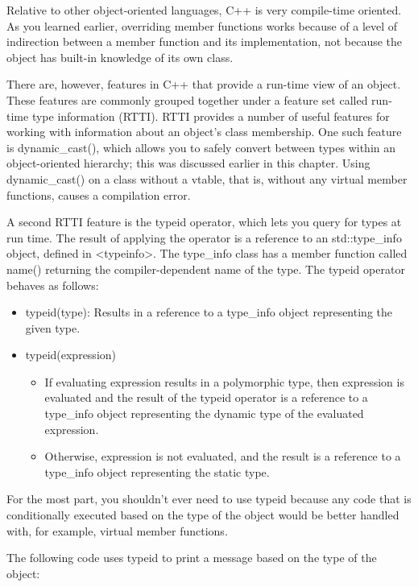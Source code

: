 Relative to other object-oriented languages, C++ is very compile-time oriented. As you learned earlier, overriding member functions works because of a level of indirection between a member function and its implementation, not because the object has built-in knowledge of its own class.

There are, however, features in C++ that provide a run-time view of an object. These features are commonly grouped together under a feature set called run-time type information (RTTI). RTTI provides a number of useful features for working with information about an object’s class membership. One such feature is dynamic\_cast(), which allows you to safely convert between types within an object-oriented hierarchy; this was discussed earlier in this chapter. Using dynamic\_cast() on a class without a vtable, that is, without any virtual member functions, causes a compilation error.

A second RTTI feature is the typeid operator, which lets you query for types at run time. The result of applying the operator is a reference to an std::type\_info object, defined in <typeinfo>. The type\_info class has a member function called name() returning the compiler-dependent name of the type. The typeid operator behaves as follows:

\begin{itemize}
\item
typeid(type): Results in a reference to a type\_info object representing the given type.

\item
typeid(expression)
\begin{itemize}
\item
If evaluating expression results in a polymorphic type, then expression is evaluated and the result of the typeid operator is a reference to a type\_info object representing the dynamic type of the evaluated expression.

\item
Otherwise, expression is not evaluated, and the result is a reference to a type\_info object representing the static type.
\end{itemize}
\end{itemize}

For the most part, you shouldn’t ever need to use typeid because any code that is conditionally executed based on the type of the object would be better handled with, for example, virtual member functions.

The following code uses typeid to print a message based on the type of the object:

